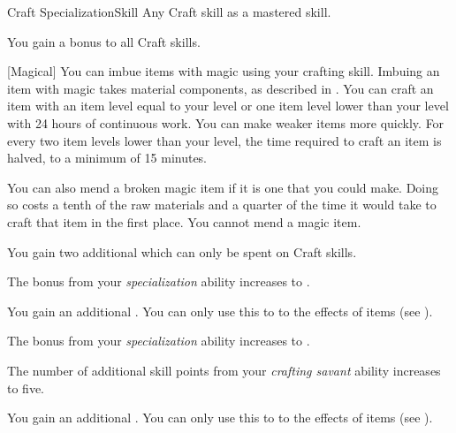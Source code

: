     \begin{feat}{Craft Specialization}{Skill}
        \featpre Any Craft skill as a mastered skill.

         You gain a  bonus to all Craft skills.

        [Magical] You can imbue items with magic using your crafting skill.
        Imbuing an item with magic takes material components, as described in .
        You can craft an item with an item level equal to your level or one item level lower than your level with 24 hours of continuous work.
        You can make weaker items more quickly.
        For every two item levels lower than your level, the time required to craft an item is halved, to a minimum of 15 minutes.

        You can also mend a broken magic item if it is one that you could make.
        Doing so costs a tenth of the raw materials and a quarter of the time it would take to craft that item in the first place.
        You cannot mend a  magic item.

         You gain two additional  which can only be spent on Craft skills.

         The bonus from your \textit{specialization} ability increases to .

         You gain an additional .
        You can only use this  to  to the effects of items (see ).

         The bonus from your \textit{specialization} ability increases to .

         The number of additional skill points from your \textit{crafting savant} ability increases to five.

         You gain an additional .
        You can only use this  to  to the effects of items (see ).
    \end{feat}


